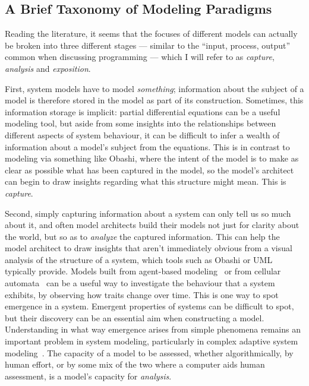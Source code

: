 \documentclass[draft,12pt]{article}
\begin{document}
\subsection{A Brief Taxonomy of Modeling Paradigms}
Reading the literature, it seems that the focuses of different models can
actually be broken into three different stages --- similar to the ``input,
process, output'' common when discussing programming --- which I will refer to
as \emph{capture}, \emph{analysis} and \emph{exposition}.\par

First, system models have to model \emph{something}; information about the
subject of a model is therefore stored in the model as part of its construction.
Sometimes, this information storage is implicit: partial differential equations
can be a useful modeling tool, but aside from some insights into the
relationships between different aspects of system behaviour, it can be difficult
to infer a wealth of information about a model's subject from the equations.
This is in contrast to modeling via something like Obashi, where the intent of the
model is to make as clear as possible what has been captured in the model, so
the model's architect can begin to draw insights regarding what this structure
might mean.
This is \emph{capture}.\par

Second, simply capturing information about a system can only tell us so much
about it, and often model architects build their models not just for clarity
about the world, but so as to \emph{analyze} the captured information. This can
help the model architect to draw insights that aren't immediately obvious from a
visual analysis of the structure of a system, which tools such as Obashi or UML
typically provide. Models built from agent-based
modeling~\citep{tisue2004netlogo} or from cellular
automata~\citep{wolfram1984cellular} can be a useful way to investigate the
behaviour that a system exhibits, by observing how traits change over time. This
is one way to spot emergence in a system\citep{miller2006modeling}. Emergent
properties of systems can be difficult to spot, but their discovery can be an
essential aim when constructing a model. Understanding in what way emergence
arises from simple phenomena remains an important problem in system modeling,
particularly in complex adaptive system modeling~\citep{gell1994complex}.
The capacity of a model to be assessed, whether algorithmically, by human
effort, or by some mix of the two where a computer aids human assessment, is a
model's capacity for \emph{analysis}.\par
\end{document}
